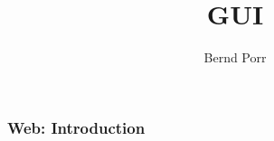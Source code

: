 \documentclass[xcolor=dvipsnames]{beamer}
\date{}
\title{GUI}
\author{Bernd Porr}
\begin{document}
\begin{frame}
\titlepage
\end{frame}




\begin{frame}[fragile]
  \frametitle{Web: Introduction}
\end{frame}
  
\end{document}
